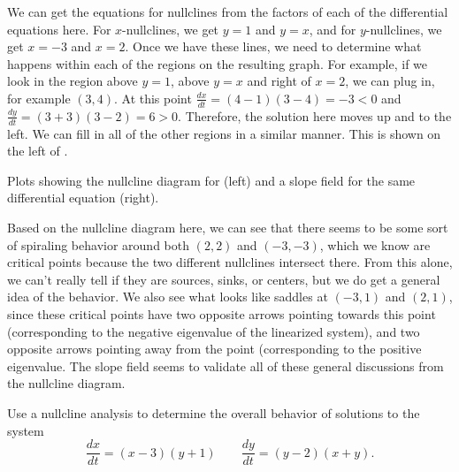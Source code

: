 \begin{exampleSol}
We can get the equations for nullclines from the factors of each of the differential equations here. For $x$-nullclines, we get $y=1$ and $y=x$, and for $y$-nullclines, we get $x=-3$ and $x=2$. Once we have these lines, we need to determine what happens within each of the regions on the resulting graph. For example, if we look in the region above $y=1$, above $y=x$ and right of $x=2$, we can plug in, for example $(3,4)$. At this point $\frac{dx}{dt} = (4-1)(3-4) = -3 < 0$ and $\frac{dy}{dt} = (3+3)(3-2) = 6 > 0$. Therefore, the solution here moves up and to the left. We can fill in all of the other regions in a similar manner. This is shown on the left of .

\begin{myfig}
\capstart
{}
\caption{Plots showing the nullcline diagram for  (left) and a slope field for the same differential equation (right). \label{fig:NCPlot1}}
\end{myfig}

Based on the nullcline diagram here, we can see that there seems to be some sort of spiraling behavior around both $(2,2)$ and $(-3, -3)$, which we know are critical points because the two different nullclines intersect there. From this alone, we can't really tell if they are sources, sinks, or centers, but we do get a general idea of the behavior. We also see what looks like saddles at $(-3, 1)$ and $(2, 1)$, since these critical points have two opposite arrows pointing towards this point (corresponding to the negative eigenvalue of the linearized system), and two opposite arrows pointing away from the point (corresponding to the positive eigenvalue. The slope field seems to validate all of these general discussions from the nullcline diagram.
\end{exampleSol}



\begin{example} \label{ex:Nullcline2}
Use a nullcline analysis to determine the overall behavior of solutions to the system
\begin{equation*}
\frac{dx}{dt} = (x-3)(y+1) \qquad \frac{dy}{dt} = (y-2)(x+y).
\end{equation*}
\end{example}

